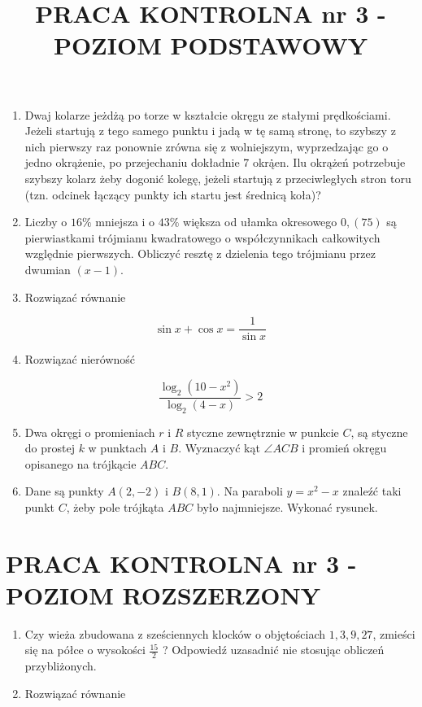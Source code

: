 \documentclass[10pt]{article}
\title{PRACA KONTROLNA nr 3 - POZIOM PODSTAWOWY }
\author{}
\date{}
\begin{document}
\maketitle
\begin{enumerate}
  \item Dwaj kolarze jeżdżą po torze w kształcie okręgu ze stałymi prędkościami. Jeżeli startują z tego samego punktu i jadą w tę samą stronę, to szybszy z nich pierwszy raz ponownie zrówna się z wolniejszym, wyprzedzając go o jedno okrążenie, po przejechaniu dokładnie 7 okrą̇̇en. Ilu okrążeń potrzebuje szybszy kolarz żeby dogonić kolegę, jeżeli startują z przeciwległych stron toru (tzn. odcinek łączący punkty ich startu jest średnicą koła)?
  \item Liczby o $16 \%$ mniejsza i o $43 \%$ większa od ułamka okresowego $0,(75)$ są pierwiastkami trójmianu kwadratowego o współczynnikach całkowitych względnie pierwszych. Obliczyć resztę z dzielenia tego trójmianu przez dwumian $(x-1)$.
  \item Rozwiązać równanie
\end{enumerate}

$$
\sin x+\cos x=\frac{1}{\sin x}
$$

\begin{enumerate}
  \setcounter{enumi}{3}
  \item Rozwiązać nierówność
\end{enumerate}

$$
\frac{\log _{2}\left(10-x^{2}\right)}{\log _{2}(4-x)}>2
$$

\begin{enumerate}
  \setcounter{enumi}{4}
  \item Dwa okręgi o promieniach $r$ i $R$ styczne zewnętrznie w punkcie $C$, są styczne do prostej $k$ w punktach $A$ i $B$. Wyznaczyć kąt $\angle A C B$ i promień okręgu opisanego na trójkącie $A B C$.
  \item Dane są punkty $A(2,-2)$ i $B(8,1)$. Na paraboli $y=x^{2}-x$ znaleźć taki punkt $C$, żeby pole trójkąta $A B C$ było najmniejsze. Wykonać rysunek.
\end{enumerate}

\section*{PRACA KONTROLNA nr 3 - POZIOM ROZSZERZONY}
\begin{enumerate}
  \item Czy wieża zbudowana z sześciennych klocków o objętościach $1,3,9,27$, zmieści się na półce o wysokości $\frac{15}{2}$ ? Odpowiedź uzasadnić nie stosując obliczeń przybliżonych.
  \item Rozwiązać równanie
\end{enumerate}
\end{document}
